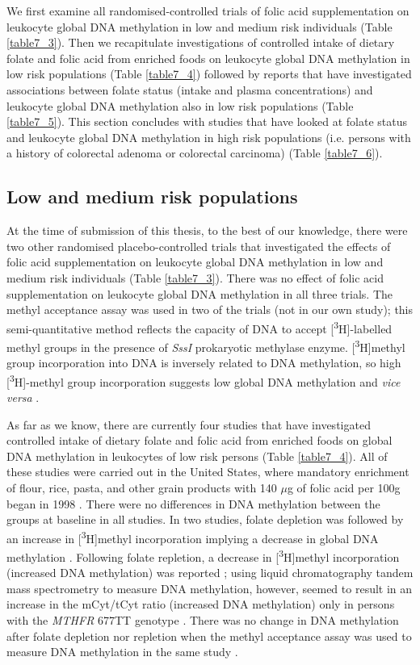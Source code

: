 \noindent We first examine all randomised-controlled trials of folic acid supplementation on leukocyte global DNA methylation in low and medium risk individuals (Table \ref{table7_3}). Then we recapitulate investigations of controlled intake of dietary folate and folic acid from enriched foods on leukocyte global DNA methylation in low risk populations (Table \ref{table7_4}) followed by reports that have investigated associations between folate status (intake and plasma concentrations) and leukocyte global DNA methylation also in low risk populations (Table \ref{table7_5}). This section concludes with studies that have looked at folate status and leukocyte global DNA methylation in high risk populations (i.e. persons with a history of colorectal adenoma or colorectal carcinoma) (Table \ref{table7_6}).

\subsection{Low and medium risk populations} %
\noindent At the time of submission of this thesis, to the best of our knowledge, there were two other randomised placebo-controlled trials that investigated the effects of folic acid supplementation on leukocyte global DNA methylation in low and medium risk individuals (Table \ref{table7_3}). There was no effect of folic acid supplementation on leukocyte global DNA methylation in all three trials. The methyl acceptance assay was used in two of the trials (not in our own study); this semi-quantitative method reflects the capacity of DNA to accept [\textsuperscript{3}H]-labelled methyl groups in the presence of \emph{SssI} prokaryotic methylase enzyme. [\textsuperscript{3}H]methyl group incorporation into DNA is inversely related to DNA methylation, so high [\textsuperscript{3}H]-methyl group incorporation suggests low global DNA methylation and \emph{vice versa} \cite{c71}.

\noindent As far as we know, there are currently four studies that have investigated controlled intake of dietary folate and folic acid from enriched foods on global DNA methylation in leukocytes of low risk persons (Table \ref{table7_4}). All of these studies were carried out in the United States, where mandatory enrichment of flour, rice, pasta, and other grain products with 140 $\mu$g of folic acid per 100g began in 1998 \cite{c72}. There were no differences in DNA methylation between the groups at baseline in all studies. In two studies, folate depletion was followed by an increase in [\textsuperscript{3}H]methyl incorporation implying a decrease in global DNA methylation \cite{c73,c74}. Following folate repletion, a decrease in [\textsuperscript{3}H]methyl incorporation (increased DNA methylation) was reported \cite{c73}; using liquid chromatography tandem mass spectrometry to measure DNA methylation, however, seemed to result in an increase in the mCyt/tCyt ratio (increased DNA methylation) only in persons with the \emph{MTHFR} 677TT genotype \cite{c75}. There was no change in DNA methylation after folate depletion nor repletion when the methyl acceptance assay was used to measure DNA methylation in the same study \cite{c75}. 
 

